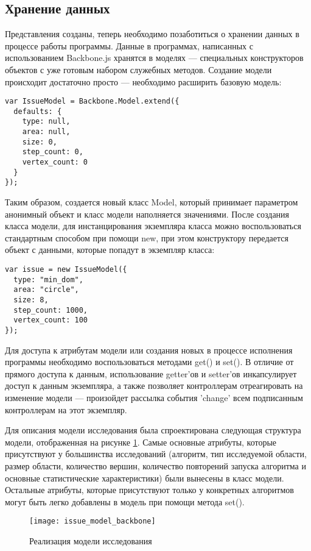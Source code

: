 \subsection{Хранение данных}

Представления созданы, теперь необходимо позаботиться о хранении данных в процессе работы программы. Данные в программах, написанных с использованием Backbone.js хранятся в моделях --- специальных конструкторов объектов с уже готовым набором служебных методов. Создание модели происходит достаточно просто --- необходимо расширить базовую модель:
\begin{lstlisting}
var IssueModel = Backbone.Model.extend({
  defaults: {
    type: null,
    area: null,
    size: 0,
    step_count: 0,
    vertex_count: 0
  }
});
\end{lstlisting}
Таким образом, создается новый класс Model, который принимает параметром анонимный объект и класс модели наполняется значениями. После создания класса модели, для инстанцирования экземпляра класса можно воспользоваться стандартным способом при помощи new, при этом конструктору передается объект с данными, которые попадут в экземпляр класса:
\begin{lstlisting}
var issue = new IssueModel({
  type: "min_dom",
  area: "circle",
  size: 8,
  step_count: 1000,
  vertex_count: 100
});
\end{lstlisting}
Для доступа к атрибутам модели или создания новых в процессе исполнения программы необходимо воспользоваться методами get() и set(). В отличие от прямого доступа к данным, использование getter'ов и setter'ов инкапсулирует доступ к данным экземпляра, а также позволяет контроллерам отреагировать на изменение модели --- произойдет рассылка события 'change' всем подписанным контроллерам на этот экземпляр.

Для описания модели исследования была спроектирована следующая структура модели, отображенная на рисунке \ref{issue_model_backbone}. Самые основные атрибуты, которые присутствуют у большинства исследований (алгоритм, тип исследуемой области, размер области, количество вершин, количество повторений запуска алгоритма и основные статистические характеристики) были вынесены в класс модели. Остальные атрибуты, которые присутствуют только у конкретных алгоритмов могут быть легко добавлены в модель при помощи метода set().

\begin{figure}[ht]
\center\texttt{[image: issue\_model\_backbone]}
\caption{Реализация модели исследования}\label{issue_model_backbone}
\end{figure}

